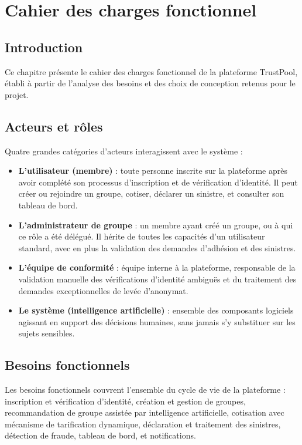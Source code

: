 \documentclass[12pt,a4paper]{report}
\begin{document}
\chapter{Cahier des charges fonctionnel}

\section{Introduction}
Ce chapitre présente le cahier des charges fonctionnel de la plateforme TrustPool, établi à partir de l'analyse des besoins et des choix de conception retenus pour le projet.

\section{Acteurs et rôles}
Quatre grandes catégories d'acteurs interagissent avec le système :

\begin{itemize}
    \item \textbf{L'utilisateur (membre)} : toute personne inscrite sur la plateforme après avoir complété son processus d'inscription et de vérification d'identité. Il peut créer ou rejoindre un groupe, cotiser, déclarer un sinistre, et consulter son tableau de bord.
    \item \textbf{L'administrateur de groupe} : un membre ayant créé un groupe, ou à qui ce rôle a été délégué. Il hérite de toutes les capacités d'un utilisateur standard, avec en plus la validation des demandes d'adhésion et des sinistres.
    \item \textbf{L'équipe de conformité} : équipe interne à la plateforme, responsable de la validation manuelle des vérifications d'identité ambiguës et du traitement des demandes exceptionnelles de levée d'anonymat.
    \item \textbf{Le système (intelligence artificielle)} : ensemble des composants logiciels agissant en support des décisions humaines, sans jamais s'y substituer sur les sujets sensibles.
\end{itemize}

\section{Besoins fonctionnels}
Les besoins fonctionnels couvrent l'ensemble du cycle de vie de la plateforme : inscription et vérification d'identité, création et gestion de groupes, recommandation de groupe assistée par intelligence artificielle, cotisation avec mécanisme de tarification dynamique, déclaration et traitement des sinistres, détection de fraude, tableau de bord, et notifications.
\end{document}
